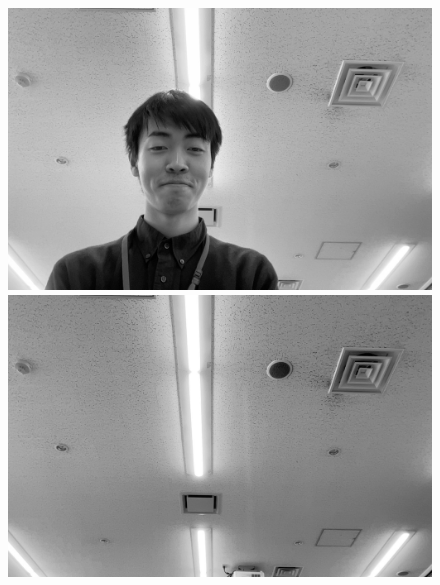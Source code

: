 \begin{figure}[H]
    \centering
    \begin{minipage}[b]{.49\textwidth}
        \centering
        \begin{minipage}[b]{.3\textwidth}
            \centering
            \includegraphics[keepaspectratio,width=\textwidth]{../../05_UnderstandingImages/fig1_g.jpg}
        \end{minipage}
        \begin{minipage}[b]{.3\textwidth}
            \centering
            \includegraphics[keepaspectratio,width=\textwidth]{../../05_UnderstandingImages/fig2_g.jpg}
        \end{minipage}
        \begin{minipage}[b]{.3\textwidth}
            \centering

\end{minipage}
\end{minipage}
\end{figure}
